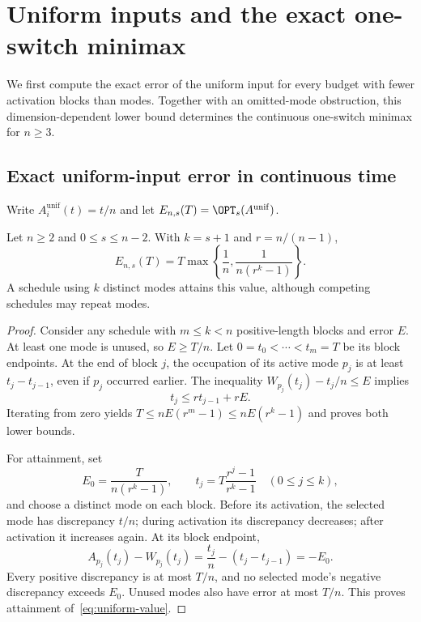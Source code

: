 \section{Uniform inputs and the exact one-switch minimax}\label{sec:one-switch}

We first compute the exact error of the uniform input for every budget with
fewer activation blocks than modes. Together with an omitted-mode
obstruction, this dimension-dependent lower bound determines the continuous
one-switch minimax for $n\ge3$.

\subsection{Exact uniform-input error in continuous time}

Write $A^{\mathrm{unif}}_i(t)=t/n$ and let
$E_{n,s}(T)=\OPT_s(A^{\mathrm{unif}})$.

\begin{theorem}\label{thm:uniform}
Let $n\ge2$ and $0\le s\le n-2$. With $k=s+1$ and $r=n/(n-1)$,
\begin{equation}\label{eq:uniform-value}
 E_{n,s}(T)=T\max\left\{\frac1n,\frac{1}{n(r^k-1)}\right\}.
\end{equation}
A schedule using $k$ distinct modes attains this value, although competing
schedules may repeat modes.
\end{theorem}
\begin{proof}
Consider any schedule with $m\le k<n$ positive-length blocks and error $E$.
At least one mode is unused, so $E\ge T/n$. Let $0=t_0<\cdots<t_m=T$
be its block endpoints. At the end of block $j$, the occupation of its active
mode $p_j$ is at least $t_j-t_{j-1}$, even if $p_j$ occurred earlier.
The inequality $W_{p_j}(t_j)-t_j/n\le E$ implies
\begin{equation}\label{eq:uniform-reach}
 t_j\le r t_{j-1}+rE.
\end{equation}
Iterating from zero yields
$T\le nE(r^m-1)\le nE(r^k-1)$ and proves both lower bounds.

For attainment, set
\[
 E_0=\frac{T}{n(r^k-1)},\qquad
 t_j=T\frac{r^j-1}{r^k-1}\quad(0\le j\le k),
\]
and choose a distinct mode on each block. Before its activation, the
selected mode has discrepancy $t/n$; during activation its discrepancy
decreases; after activation it increases again. At its block endpoint,
\[
 A_{p_j}(t_j)-W_{p_j}(t_j)
 =\frac{t_j}{n}-(t_j-t_{j-1})=-E_0.
\]
Every positive discrepancy is at most $T/n$, and no selected mode's
negative discrepancy exceeds $E_0$. Unused modes also have error at most
$T/n$. This proves attainment of~\eqref{eq:uniform-value}.
\end{proof}

